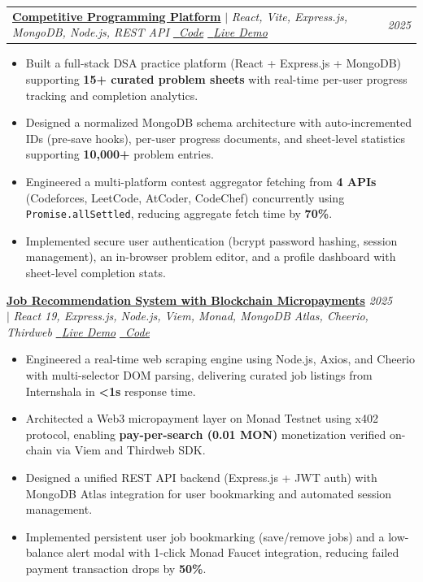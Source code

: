\documentclass[a4paper,10pt]{article}
\makeatletter
\newcommand{\resumeItem}[1]{
  \item\small{#1 \vspace{-0.5pt}}
}
\newcommand{\resumeProjectShort}[4]{
\vspace{1.5mm}\item[]
    \begin{tabular*}{\textwidth}[t]{l@{\extracolsep{\fill}}r}
        \textbf{\href{#4}{#1}} \small{$|$ \textit{#2}} & \textit{\footnotesize{#3}} \\
    \end{tabular*}
    \vspace{-2.4mm}
}
\newcommand{\resumeItemListStart}{%
  \begin{justify}%
  \begin{itemize}[leftmargin=4ex, rightmargin=0ex, noitemsep, labelsep=1.5mm, itemsep=1pt,
    label={\small$\bullet$}]\small}
\newcommand{\resumeItemListEnd}{\end{itemize}\end{justify}\vspace{1mm}}
\makeatother
\begin{document}
    \resumeProjectShort
      {Competitive Programming Platform}
      {React, Vite, Express.js, MongoDB, Node.js, REST API \quad \href{https://github.com/prakash-knight/competitive-programming-platform}{\faGithub\ \textit{Code}} \quad \href{https://competitive-programming-platform-black.vercel.app/}{\faExternalLinkAlt\ \textit{Live Demo}}}
      {2025}
      {https://competitive-programming-platform-black.vercel.app/}
      \resumeItemListStart
      \vspace{-3mm}
        \resumeItem{Built a full-stack DSA practice platform (React + Express.js + MongoDB) supporting \textbf{15+ curated problem sheets} with real-time per-user progress tracking and completion analytics.}
        \resumeItem{Designed a normalized MongoDB schema architecture with auto-incremented IDs (pre-save hooks), per-user progress documents, and sheet-level statistics supporting \textbf{10,000+} problem entries.}
        \resumeItem{Engineered a multi-platform contest aggregator fetching from \textbf{4 APIs} (Codeforces, LeetCode, AtCoder, CodeChef) concurrently using \texttt{Promise.allSettled}, reducing aggregate fetch time by \textbf{70\%}.}
        \resumeItem{Implemented secure user authentication (bcrypt password hashing, session management), an in-browser problem editor, and a profile dashboard with sheet-level completion stats.}
      \resumeItemListEnd
\vspace{-2mm}

    \vspace{1mm}\item[]
    {%
      \textbf{\href{https://ai-job-recommendation-system-with-b.vercel.app/}{Job Recommendation System with Blockchain Micropayments}}
      \hfill \textit{\footnotesize{2025}}%
    }\\[-2pt]
    \vspace{1mm}
    \small{$|$ \textit{React 19, Express.js, Node.js, Viem, Monad, MongoDB Atlas, Cheerio, Thirdweb} \quad
      \href{https://ai-job-recommendation-system-with-b.vercel.app/}{\faExternalLinkAlt\ \textit{Live Demo}} \quad
      \href{https://github.com/prakash-knight/AI-Job-Recommendation-System-with-Blockchain-Micropayments-}{\faGithub\ \textit{Code}}%
    }
    \vspace{1mm}
      \resumeItemListStart
      \vspace{-3mm}
        \resumeItem{Engineered a real-time web scraping engine using Node.js, Axios, and Cheerio with multi-selector DOM parsing, delivering curated job listings from Internshala in \textbf{<1s} response time.}
        \resumeItem{Architected a Web3 micropayment layer on Monad Testnet using x402 protocol, enabling \textbf{pay-per-search (0.01 MON)} monetization verified on-chain via Viem and Thirdweb SDK.}
        \resumeItem{Designed a unified REST API backend (Express.js + JWT auth) with MongoDB Atlas integration for user bookmarking and automated session management.}
        \resumeItem{Implemented persistent user job bookmarking (save/remove jobs) and a low-balance alert modal with 1-click Monad Faucet integration, reducing failed payment transaction drops by \textbf{50\%}.}
      \resumeItemListEnd
\vspace{-2mm}
\end{document}
